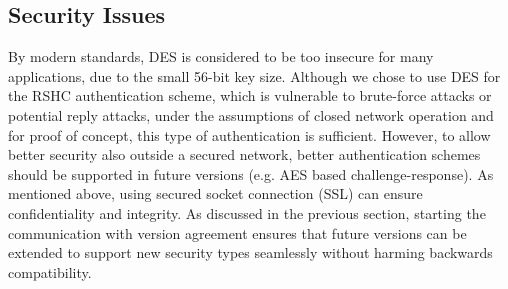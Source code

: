 \subsection{Security Issues}
\label{sec:security:issues}

By modern standards, DES is considered to be too insecure for many applications, due to the small 56-bit key size. Although we chose to use DES for the RSHC authentication scheme, which is vulnerable to brute-force attacks or potential reply attacks, under the assumptions of closed network operation and for proof of concept, this type of authentication is sufficient. However, to allow better security also outside a secured network, better authentication schemes should be supported in future versions (e.g. AES based challenge-response). As mentioned above, using secured socket connection (SSL) can ensure confidentiality and integrity. As discussed in the previous section, starting the communication with version agreement ensures that future versions can be extended to support new security types seamlessly without harming backwards compatibility.
